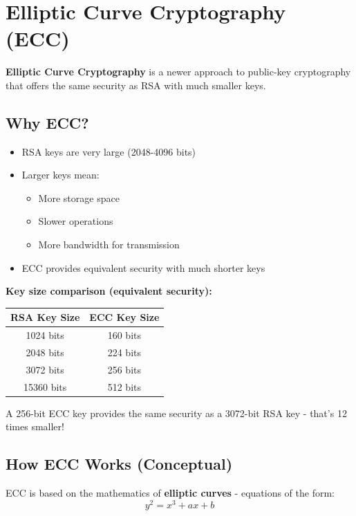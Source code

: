 \documentclass[11pt,a4paper]{report}
\begin{document}
\newpage
\section{Elliptic Curve Cryptography (ECC)}

\textbf{Elliptic Curve Cryptography} is a newer approach to public-key cryptography that offers the same security as RSA with much smaller keys.

\subsection{Why ECC?}

\begin{itemize}
\item RSA keys are very large (2048-4096 bits)
\item Larger keys mean:
   \begin{itemize}
   \item More storage space
   \item Slower operations
   \item More bandwidth for transmission
   \end{itemize}
\item ECC provides equivalent security with much shorter keys
\end{itemize}

\textbf{Key size comparison (equivalent security):}
\begin{center}
\begin{tabular}{|c|c|}
\hline
\textbf{RSA Key Size} & \textbf{ECC Key Size} \\
\hline
1024 bits & 160 bits \\
2048 bits & 224 bits \\
3072 bits & 256 bits \\
15360 bits & 512 bits \\
\hline
\end{tabular}
\end{center}

A 256-bit ECC key provides the same security as a 3072-bit RSA key - that's 12 times smaller!

\subsection{How ECC Works (Conceptual)}

ECC is based on the mathematics of \textbf{elliptic curves} - equations of the form:
\[ y^2 = x^3 + ax + b \]
\end{document}
